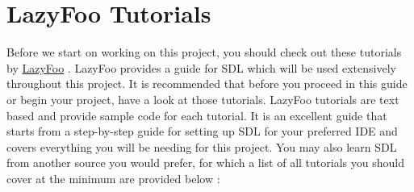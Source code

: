 \documentclass[11pt,fleqn]{book} %
\begin{document}
\chapter{LazyFoo Tutorials} %
Before we start on working on this project, you should check out these tutorials by \href{http://lazyfoo.net/tutorials/SDL/}{LazyFoo} . LazyFoo provides a guide for SDL which will be used extensively throughout this project. It is recommended that before you proceed in this guide or begin your project, have a look at those tutorials. LazyFoo tutorials are text based and provide sample code for each tutorial. It is an excellent guide that starts from a step-by-step guide for setting up SDL for your preferred IDE and covers everything you will be needing for this project. You may also learn SDL from another source you would prefer, for which a list of all tutorials you should cover at the minimum are provided below :
\end{document}
